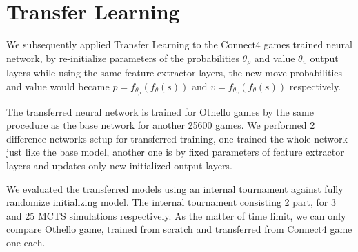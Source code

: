 \documentclass[12pt,a4paper]{report}
\begin{document}
\section{Transfer Learning}
\hspace{0.6cm} We subsequently applied Transfer Learning to the Connect4 games trained neural network, by re-initialize parameters of the probabilities \(\theta_\rho\) and value \(\theta_\upsilon\) output layers while using the same feature extractor layers, the new move probabilities and value would became \(p = f_{\theta_\rho}(f_\theta(s))\) and \(v = f_{\theta_\upsilon}(f_\theta(s))\) respectively. \par
The transferred neural network is trained for Othello games by the same procedure as the base network for another 25600 games. We performed 2 difference networks setup for transferred training, one trained the whole network just like the base model, another one is by fixed parameters of feature extractor layers and updates only new initialized output layers.\par
We evaluated the transferred models using an internal tournament against fully randomize initializing model. The internal tournament consisting 2 part, for 3 and 25 MCTS simulations respectively. As the matter of time limit, we can only compare Othello game, trained from scratch and transferred from Connect4 game one each.
\end{document}
